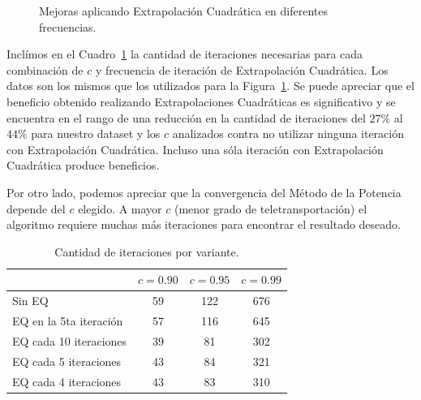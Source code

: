 \begin{figure}[!htbp]
{    }
    \caption{\label{fig:eq_c} Mejoras aplicando Extrapolación Cuadrática en diferentes frecuencias.}
\end{figure}

Inclímos en el Cuadro~\ref{tab:iteraciones} la cantidad de iteraciones
necesarias para cada combinación de $c$ y frecuencia de iteración de
Extrapolación Cuadrática. Los datos son los mismos que los utilizados para la
Figura~\ref{fig:eq_c}. Se puede apreciar que el beneficio obtenido realizando
Extrapolaciones Cuadráticas es significativo y se encuentra en el rango de una
reducción en la cantidad de iteraciones del $27\%$ al $44\%$ para nuestro
dataset y los $c$ analizados contra no utilizar ninguna iteración con
Extrapolación Cuadrática. Incluso una sóla iteración con Extrapolación
Cuadrática produce beneficios.

Por otro lado, podemos apreciar que la convergencia del Método de la Potencia
depende del $c$ elegido. A mayor $c$ (menor grado de teletransportación) el
algoritmo requiere muchas más iteraciones para encontrar el resultado deseado.

\begin{table}[!htbp]
    \centering
    \begin{tabular}{|l|c|c|c|} \hline
                                    & $c=0.90$  & $c=0.95$  & $c=0.99$  \\ \hline
        Sin EQ                      & 59        & 122       & 676       \\ \hline
        EQ en la 5ta iteración      & 57        & 116       & 645       \\ \hline
        EQ cada 10 iteraciones      & 39        & 81        & 302       \\ \hline
        EQ cada 5 iteraciones       & 43        & 84        & 321       \\ \hline
        EQ cada 4 iteraciones       & 43        & 83        & 310       \\ \hline
    \end{tabular}
    \caption{Cantidad de iteraciones por variante.}\label{tab:iteraciones}
\end{table}
